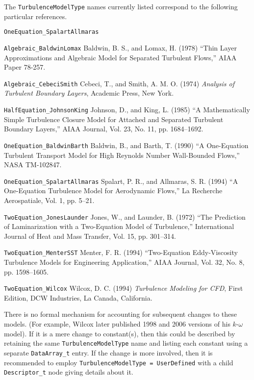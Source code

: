 The \texttt{TurbulenceModelType} names currently listed correspond to
the following particular references.

\begin{Ventryi}{\texttt{OneEquation\_SpalartAllmaras}}
\item [\texttt{Algebraic\_BaldwinLomax}]
      Baldwin, B. S., and Lomax, H. (1978) ``Thin Layer Approximations
      and Algebraic Model for Separated Turbulent Flows,'' AIAA Paper
      78-257.
\item [\texttt{Algebraic\_CebeciSmith}]
      Cebeci, T., and Smith, A. M. O. (1974) \textit{Analysis of
      Turbulent Boundary Layers}, Academic Press, New York.
\item [\texttt{HalfEquation\_JohnsonKing}]
      Johnson, D., and King, L. (1985) ``A Mathematically Simple
      Turbulence Closure Model for Attached and Separated Turbulent
      Boundary Layers,'' AIAA Journal, Vol. 23, No. 11, pp. 1684--1692.
\item [\texttt{OneEquation\_BaldwinBarth}]
      Baldwin, B., and Barth, T. (1990) ``A One-Equation Turbulent
      Transport Model for High Reynolds Number Wall-Bounded Flows,'' NASA
      TM-102847.
\item [\texttt{OneEquation\_SpalartAllmaras}]
      Spalart, P. R., and Allmaras, S. R. (1994) ``A One-Equation
      Turbulence Model for Aerodynamic Flows,'' La Recherche
      Aerospatiale, Vol. 1, pp. 5--21.
\item [\texttt{TwoEquation\_JonesLaunder}]
      Jones, W., and Launder, B. (1972) ``The Prediction of
      Laminarization with a Two-Equation Model of Turbulence,''
      International Journal of Heat and Mass Transfer, Vol. 15,
      pp. 301--314.
\item [\texttt{TwoEquation\_MenterSST}]
      Menter, F. R. (1994) ``Two-Equation Eddy-Viscosity Turbulence
      Models for Engineering Application,'' AIAA Journal, Vol. 32,
      No. 8, pp. 1598--1605.
\item [\texttt{TwoEquation\_Wilcox}]
      Wilcox, D. C. (1994) \textit{Turbulence Modeling for CFD}, First
      Edition, DCW Industries, La Canada, California.
\end{Ventryi}

There is no formal mechanism for accounting for subsequent changes to
these models.
(For example, Wilcox later published 1998 and 2006 versions of his
$k$-$\omega$ model).
If it is a mere change to constant(s), then this could be described by
retaining the same \texttt{TurbulenceModelType} name and listing each
constant using a separate \texttt{DataArray\_t} entry.
If the change is more involved, then it is recommended to
employ \texttt{TurbulenceModelType = UserDefined} with a child
\texttt{Descriptor\_t} node giving details about it.

